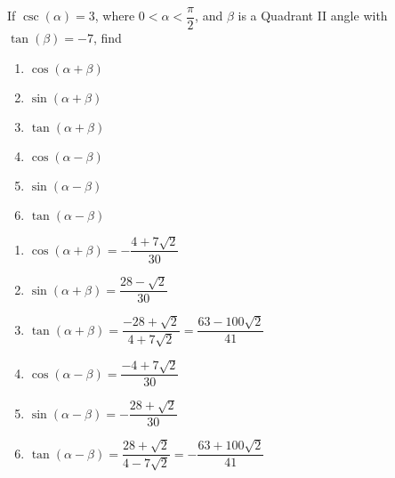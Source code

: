 {If $\csc(\alpha) = 3$, where $0 < \alpha < \dfrac{\pi}{2}$, and $\beta$ is a Quadrant II angle with $\tan(\beta) = -7$, find

\begin{multicols}{2}

\begin{enumerate}

\item  $\cos(\alpha + \beta)$
\item  $\sin(\alpha + \beta)$
\item  $\tan(\alpha + \beta)$
\item  $\cos(\alpha - \beta)$
\item  $\sin(\alpha - \beta)$
\item  $\tan(\alpha - \beta)$

\end{enumerate}

\end{multicols}}
{
\begin{enumerate}
\item  $\cos(\alpha + \beta) = - \dfrac{4+7\sqrt{2}}{30}$
\item  $\sin(\alpha + \beta) = \dfrac{28-\sqrt{2}}{30}$
\item  $\tan(\alpha + \beta) = \dfrac{-28+\sqrt{2}}{4+7\sqrt{2}} = \dfrac{63-100\sqrt{2}}{41}$
\item  $\cos(\alpha - \beta) =  \dfrac{-4+7\sqrt{2}}{30}$
\item  $\sin(\alpha - \beta) = - \dfrac{28+\sqrt{2}}{30}$
\item  $\tan(\alpha - \beta)= \dfrac{28+\sqrt{2}}{4-7\sqrt{2}} = -\dfrac{63+100\sqrt{2}}{41}$
\end{enumerate}
}